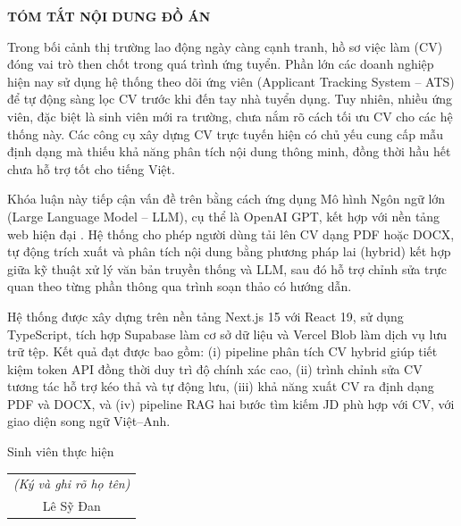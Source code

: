\documentclass[../DoAn.tex]{subfiles}
\begin{document}
\begin{center}
    \Large{\textbf{TÓM TẮT NỘI DUNG ĐỒ ÁN}}\\
\end{center}
\vspace{1cm}
Trong bối cảnh thị trường lao động ngày càng cạnh tranh, hồ sơ việc làm (CV) đóng vai trò then chốt trong quá trình ứng tuyển. Phần lớn các doanh nghiệp hiện nay sử dụng hệ thống theo dõi ứng viên (Applicant Tracking System -- ATS) để tự động sàng lọc CV trước khi đến tay nhà tuyển dụng. Tuy nhiên, nhiều ứng viên, đặc biệt là sinh viên mới ra trường, chưa nắm rõ cách tối ưu CV cho các hệ thống này. Các công cụ xây dựng CV trực tuyến hiện có chủ yếu cung cấp mẫu định dạng mà thiếu khả năng phân tích nội dung thông minh, đồng thời hầu hết chưa hỗ trợ tốt cho tiếng Việt.

Khóa luận này tiếp cận vấn đề trên bằng cách ứng dụng Mô hình Ngôn ngữ lớn (Large Language Model -- LLM), cụ thể là OpenAI GPT, kết hợp với nền tảng web hiện đại . Hệ thống cho phép người dùng tải lên CV dạng PDF hoặc DOCX, tự động trích xuất và phân tích nội dung bằng phương pháp lai (hybrid) kết hợp giữa kỹ thuật xử lý văn bản truyền thống và LLM, sau đó hỗ trợ chỉnh sửa trực quan theo từng phần thông qua trình soạn thảo có hướng dẫn.

Hệ thống được xây dựng trên nền tảng Next.js 15 với React 19, sử dụng TypeScript, tích hợp Supabase làm cơ sở dữ liệu và Vercel Blob làm dịch vụ lưu trữ tệp. Kết quả đạt được bao gồm: (i) pipeline phân tích CV hybrid giúp tiết kiệm token API đồng thời duy trì độ chính xác cao, (ii) trình chỉnh sửa CV tương tác hỗ trợ kéo thả và tự động lưu, (iii) khả năng xuất CV ra định dạng PDF và DOCX, và (iv) pipeline RAG hai bước tìm kiếm JD phù hợp với CV, với giao diện song ngữ Việt--Anh.

\begin{flushright}
Sinh viên thực hiện\\
\begin{tabular}{@{}c@{}}
\textit{(Ký và ghi rõ họ tên)}\\[1.5cm]
Lê Sỹ Đan
\end{tabular}
\end{flushright}
\end{document}
